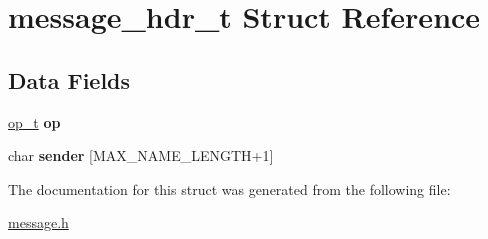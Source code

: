 \hypertarget{structmessage__hdr__t}{}\section{message\+\_\+hdr\+\_\+t Struct Reference}
\label{structmessage__hdr__t}
\subsection*{Data Fields}
\begin{DoxyCompactItemize}
\item 
\mbox{\label{structmessage__hdr__t_a26b2efa792334cce1cd82d1c63754539}} 
\hyperlink{ops_8h_ac6fa1b34da8872e34c2936391332f44c}{op\+\_\+t} {\bfseries op}
\item 
\mbox{\label{structmessage__hdr__t_a6aa18d82629c912fe68c229936b87c77}} 
char {\bfseries sender} \mbox{[}M\+A\+X\+\_\+\+N\+A\+M\+E\+\_\+\+L\+E\+N\+G\+TH+1\mbox{]}
\end{DoxyCompactItemize}


The documentation for this struct was generated from the following file\+:\begin{DoxyCompactItemize}
\item 
\hyperlink{message_8h}{message.\+h}\end{DoxyCompactItemize}
